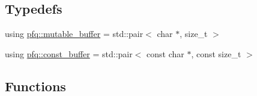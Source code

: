 \subsection*{Typedefs}
\begin{DoxyCompactItemize}
\item 
using \hyperlink{namespacepfq_ad7b88920eaf729154354741132483ea8}{pfq\+::mutable\+\_\+buffer} = std\+::pair$<$ char $\ast$, size\+\_\+t $>$
\item 
using \hyperlink{namespacepfq_ac835a1bd09b4cbaba61c100b50d0a99f}{pfq\+::const\+\_\+buffer} = std\+::pair$<$ const char $\ast$, const size\+\_\+t $>$
\end{DoxyCompactItemize}
\subsection*{Functions}
